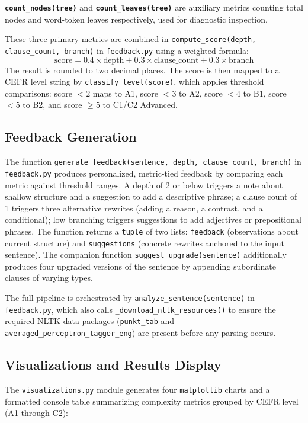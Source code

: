 \documentclass[11pt]{article}
\begin{document}
\textbf{\texttt{count\_nodes(tree)}} and \textbf{\texttt{count\_leaves(tree)}} are auxiliary metrics counting total nodes and word-token leaves respectively, used for diagnostic inspection.
 
These three primary metrics are combined in \texttt{compute\_score(depth, clause\_count, branch)} in \texttt{feedback.py} using a weighted formula:
\[
  \text{score} = 0.4 \times \text{depth} + 0.3 \times \text{clause\_count} + 0.3 \times \text{branch}
\]
The result is rounded to two decimal places. The score is then mapped to a CEFR level string by \texttt{classify\_level(score)}, which applies threshold comparisons: score $< 2$ maps to A1, score $< 3$ to A2, score $< 4$ to B1, score $< 5$ to B2, and score $\geq 5$ to C1/C2 Advanced.
 
\subsection*{Feedback Generation}
 
The function \texttt{generate\_feedback(sentence, depth, clause\_count, branch)} in \texttt{feedback.py} produces personalized, metric-tied feedback by comparing each metric against threshold ranges. A depth of 2 or below triggers a note about shallow structure and a suggestion to add a descriptive phrase; a clause count of 1 triggers three alternative rewrites (adding a reason, a contrast, and a conditional); low branching triggers suggestions to add adjectives or prepositional phrases. The function returns a \texttt{tuple} of two lists: \texttt{feedback} (observations about current structure) and \texttt{suggestions} (concrete rewrites anchored to the input sentence). The companion function \texttt{suggest\_upgrade(sentence)} additionally produces four upgraded versions of the sentence by appending subordinate clauses of varying types.
 
The full pipeline is orchestrated by \texttt{analyze\_sentence(sentence)} in \texttt{feedback.py}, which also calls \texttt{\_download\_nltk\_resources()} to ensure the required NLTK data packages (\texttt{punkt\_tab} and \texttt{averaged\_perceptron\_tagger\_eng}) are present before any parsing occurs.
 
\subsection*{Visualizations and Results Display}
 
The \texttt{visualizations.py} module generates four \texttt{matplotlib} \cite{matplotlib} charts and a formatted console table summarizing complexity metrics grouped by CEFR level (A1 through C2):
 
\end{document}
